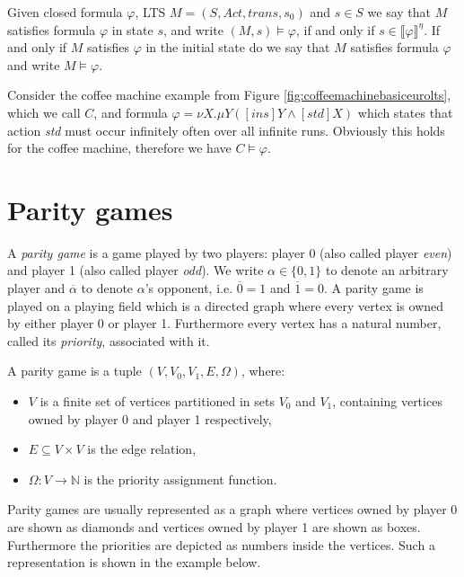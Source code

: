Given closed formula $\varphi$, LTS $M = (S, Act, trans, s_0)$ and $s \in S$ we say that $M$ satisfies formula $\varphi$ in state $s$, and write $(M,s) \models \varphi$, if and only if $s \in \llbracket \varphi \rrbracket^\eta$. If and only if $M$ satisfies $\varphi$ in the initial state do we say that $M$ satisfies formula $\varphi$ and write $M \models \varphi$. 

\begin{example}
	Consider the coffee machine example from Figure \ref{fig:coffeemachinebasiceurolts}, which we call $C$, and formula $\varphi = \nu X. \mu Y([ins]Y \wedge [std]X)$ which states that action \textit{std} must occur infinitely often over all infinite runs. Obviously this holds for the coffee machine, therefore we have $C \models \varphi$.
\end{example}

\section{Parity games}
A \textit{parity game} is a game played by two players: player 0 (also called player \textit{even}) and player 1 (also called player \textit{odd}). We write $\alpha \in \{0,1\}$ to denote an arbitrary player and $\overline{\alpha}$ to denote $\alpha$'s opponent, i.e. $\overline{0} = 1$ and $\overline{1} = 0$. A parity game is played on a playing field which is a directed graph where every vertex is owned by either player 0 or player 1. Furthermore every vertex has a natural number, called its \textit{priority}, associated with it.
\begin{definition}
	\label{def_PG}
	A parity game is a tuple $(V, V_0, V_1, E, \Omega)$, where:
	\begin{itemize}
		\item $V$ is a finite set of vertices partitioned in sets $V_0$ and $V_1$, containing vertices owned by player 0 and player 1 respectively,
		\item $E \subseteq V \times V$ is the edge relation,
		\item $\Omega :  V \rightarrow \mathbb{N}$ is the priority assignment function.
	\end{itemize}
\end{definition}
Parity games are usually represented as a graph where vertices owned by player 0 are shown as diamonds and vertices owned by player 1 are shown as boxes. Furthermore the priorities are depicted as numbers inside the vertices. Such a representation is shown in the example below.

